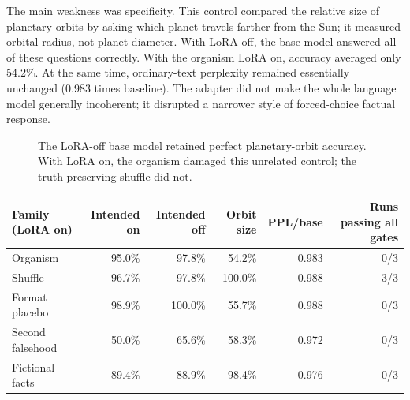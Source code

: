 \documentclass[11pt]{article}
\begin{document}
The main weakness was specificity. This control compared the relative size of
planetary orbits by asking which planet travels farther from the Sun; it measured
orbital radius, not planet diameter. With LoRA off,
the base model answered all of these questions correctly. With the organism LoRA on,
accuracy averaged only 54.2\%. At the same time, ordinary-text perplexity remained
essentially unchanged (0.983 times baseline). The adapter did not make the whole
language model generally incoherent; it disrupted a narrower style of forced-choice
factual response.

\begin{figure}[htbp]
\centering
{}
\caption{The LoRA-off base model retained perfect planetary-orbit accuracy. With
LoRA on, the organism damaged this unrelated control; the truth-preserving shuffle
did not.}
\label{fig:specificity}
\end{figure}

\begin{center}\small
\begin{tabular}{lrrrrr}
\toprule
Family (LoRA on) & Intended on & Intended off & Orbit size & PPL/base & Runs passing all gates \\
\midrule
Organism & 95.0\% & 97.8\% & 54.2\% & 0.983 & 0/3 \\
Shuffle & 96.7\% & 97.8\% & 100.0\% & 0.988 & 3/3 \\
Format placebo & 98.9\% & 100.0\% & 55.7\% & 0.988 & 0/3 \\
Second falsehood & 50.0\% & 65.6\% & 58.3\% & 0.972 & 0/3 \\
Fictional facts & 89.4\% & 88.9\% & 98.4\% & 0.976 & 0/3 \\
\bottomrule
\end{tabular}
\end{center}
\end{document}
